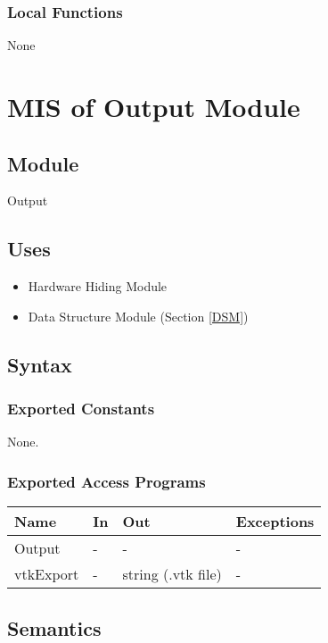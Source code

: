 \documentclass[12pt, titlepage]{article}
\begin{document}
\subsubsection{Local Functions}

None

\newpage
%
%
%
%
\section{MIS of Output Module} \label{OM} 

\subsection{Module}
Output

\subsection{Uses}
\begin{itemize}
	\item Hardware Hiding Module
	\item Data Structure Module (Section \ref{DSM})
	
\end{itemize}

\subsection{Syntax}

\subsubsection{Exported Constants}
None.
\subsubsection{Exported Access Programs}

\begin{center}
	\begin{tabular}{p{2cm} p{4cm} p{4cm} p{2cm}}
		\hline
		\textbf{Name} & \textbf{In} & \textbf{Out} & \textbf{Exceptions} \\
		\hline
		Output& - & - & - \\
		vtkExport & - & string (.vtk file) & - \\
		
		\hline
	\end{tabular}
\end{center}

\subsection{Semantics}
\end{document}
